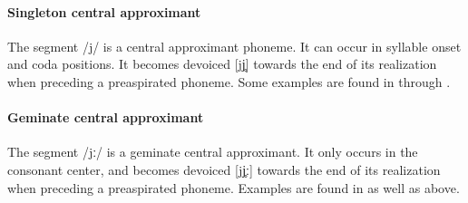 \paragraph{Singleton central approximant}
The segment /j/ is a central approximant phoneme. It can occur in syllable onset and coda positions. 
It becomes devoiced [jj̥] towards the end of its realization when preceding a preaspirated phoneme. 
Some examples are found in  through . 
%

\paragraph{Geminate central approximant}
The segment /jː/ is a geminate central approximant. It only occurs in the consonant center, and becomes devoiced [jj̥ː] towards the end of its realization when preceding a preaspirated phoneme.  
Examples are found in  as well as  above.

